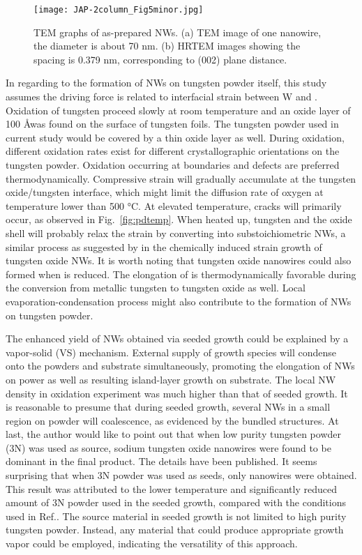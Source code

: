 \begin{figure}[htb]
\centering
\texttt{[image: JAP-2column\_Fig5minor.jpg]}
\caption[Characterization of : TEM cont]{TEM graphs of as-prepared NWs. (a) TEM image of one nanowire, the diameter is about 70 nm. (b) HRTEM images showing the spacing is 0.379 nm, corresponding to (002) plane distance.}
\label{fig:woseedtem2}
\end{figure}

In regarding to the formation of NWs on tungsten powder itself, this study assumes the driving force is related to interfacial strain between W and . Oxidation of tungsten proceed slowly at room temperature and an oxide layer of 100 \AA was found on the surface of tungsten foils.\cite{Warren1996} The tungsten powder used in current study would be covered by a thin oxide layer as well. During oxidation, different oxidation rates exist for different crystallographic orientations on the tungsten powder. Oxidation occurring at boundaries and defects are preferred thermodynamically.\cite{You2010} Compressive strain will gradually accumulate at the tungsten oxide/tungsten interface, which might limit the diffusion rate of oxygen at temperature lower than 500 \si{\degreeCelsius}.\cite{tungsten1999} At elevated temperature, cracks will primarily occur, as observed in Fig.~\ref{fig:pdtemp}. When heated up, tungsten and the oxide shell will probably relax the strain by converting into substoichiometric NWs, a similar process as suggested by \citeauthor{Klinke2005} in the chemically induced strain growth of tungsten oxide NWs.\cite{Klinke2005} It is worth noting that tungsten oxide nanowires could also formed when  is reduced.\cite{Sarin1975} The elongation of  is thermodynamically favorable during the conversion from metallic tungsten to tungsten oxide as well. Local evaporation-condensation process might also contribute to the formation of NWs on tungsten powder.

The enhanced yield of NWs obtained via seeded growth could be explained by a vapor-solid (VS) mechanism. External supply of growth species will condense onto the powders and substrate simultaneously, promoting the elongation of NWs on power as well as resulting island-layer growth on substrate. The local NW density in oxidation experiment was much higher than that of seeded growth. It is reasonable to presume that during seeded growth, several NWs in a small region on powder will coalescence, as evidenced by the bundled structures. At last, the author would like to point out that when low purity tungsten powder (3N) was used as source, sodium tungsten oxide nanowires were found to be dominant in the final product. The details have been published.\cite{Sheng2014} It seems surprising that when 3N powder was used as seeds, only  nanowires were obtained. This result was attributed to the lower temperature and significantly reduced amount of 3N powder used in the seeded growth, compared with the conditions used in Ref.\cite{Sheng2014}. The source material in seeded growth is not limited to high purity tungsten powder. Instead, any material that could produce appropriate growth vapor could be employed, indicating the versatility of this approach.

